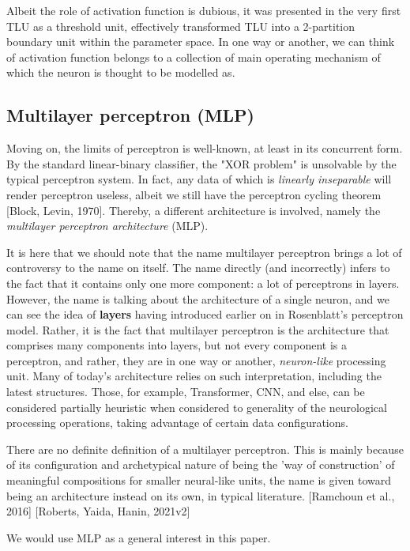 Albeit the role of activation function is dubious, it was presented in the very first TLU as a threshold unit, effectively transformed TLU into a 2-partition boundary unit within the parameter space. In one way or another, we can think of activation function belongs to a collection of main operating mechanism of which the neuron is thought to be modelled as. 

\subsection{Multilayer perceptron (MLP)}

Moving on, the limits of perceptron is well-known, at least in its concurrent form. By the standard linear-binary classifier, the "XOR problem" is unsolvable by the typical perceptron system. In fact, any data of which is \textit{linearly inseparable} will render perceptron useless, albeit we still have the perceptron cycling theorem [Block, Levin, 1970]. Thereby, a different architecture is involved, namely the \textit{multilayer perceptron architecture} (MLP).

It is here that we should note that the name multilayer perceptron brings a lot of controversy to the name on itself. The name directly (and incorrectly) infers to the fact that it contains only one more component: a lot of perceptrons in layers. However, the name is talking about the architecture of a single neuron, and we can see the idea of \textbf{layers} having introduced earlier on in Rosenblatt's perceptron model. Rather, it is the fact that multilayer perceptron is the architecture that comprises many components into layers, but not every component is a perceptron, and rather, they are in one way or another, \textit{neuron-like} processing unit. Many of today's architecture relies on such interpretation, including the latest structures. Those, for example, Transformer, CNN, and else, can be considered partially heuristic when considered to generality of the neurological processing operations, taking advantage of certain data configurations. 

There are no definite definition of a multilayer perceptron. This is mainly because of its configuration and archetypical nature of being the 'way of construction' of meaningful compositions for smaller neural-like units, the name is given toward being an architecture instead on its own, in typical literature. [Ramchoun et al., 2016] [Roberts, Yaida, Hanin, 2021v2]

We would use MLP as a general interest in this paper. 


